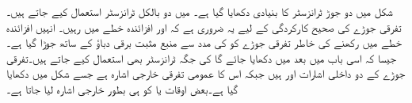
شکل  میں دو جوڑ ٹرانزسٹر کا بنیادی  دکھایا گیا ہے۔ میں دو بالکل  ٹرانزسٹر  استعمال کیے جاتے ہیں۔تفرقی جوڑے کی صحیح کارکردگی کے لیے یہ ضروری ہے کہ   اور   افزائندہ خطے میں رہیں۔ انہیں افزائندہ خطے میں رکھنے کی خاطر تفرقی جوڑے کو  کی مدد سے منبع مثبت برقی دباؤ   کے ساتھ جوڑا گیا ہے۔جیسا کہ اسی باب میں بعد میں دکھایا جائے گا  کی جگہ ٹرانزسٹر بھی استعمال کیے جاتے ہیں۔تفرقی جوڑے کے دو داخلی اشارات  اور  ہیں جبکہ اس کا عمومی تفرقی خارجی اشارہ  ہے جسے شکل   میں دکھایا گیا ہے۔بعض اوقات   یا   کو ہی بطور خارجی اشارہ  لیا جاتا ہے۔

